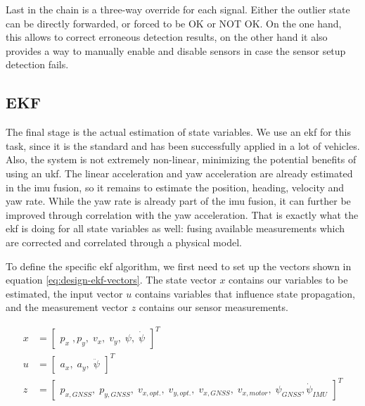 Last in the chain is a three-way override for each signal. Either the outlier state can be directly forwarded, or forced to be OK or NOT OK. On the one hand, this allows to correct erroneous detection results, on the other hand it also provides a way to manually enable and disable sensors in case the sensor setup detection fails.

\subsection{EKF}
The final stage is the actual estimation of state variables. We use an \gls{ekf} for this task, since it is the standard and has been successfully applied in a lot of vehicles. Also, the system is not extremely non-linear, minimizing the potential benefits of using an \gls{ukf}. The linear acceleration and yaw acceleration are already estimated in the \gls{imu} fusion, so it remains to estimate the position, heading, velocity and yaw rate. While the yaw rate is already part of the \gls{imu} fusion, it can further be improved through correlation with the yaw acceleration. That is exactly what the \gls{ekf} is doing for all state variables as well: fusing available measurements which are corrected and correlated through a physical model.

To define the specific \gls{ekf} algorithm, we first need to set up the vectors shown in equation \ref{eq:design-ekf-vectors}. The state vector $x$ contains our variables to be estimated, the input vector $u$ contains variables that influence state propagation, and the measurement vector $z$ contains our sensor measurements.

\begin{subequations}\label{eq:design-ekf-vectors}
\begin{alignat}{2}%
x &= \begin{bmatrix}p_x\;, p_y,\; v_x,\; v_y,\; \psi,\; \dot{\psi}\end{bmatrix}^T \\%
u &= \begin{bmatrix}a_x,\; a_y,\; \ddot{\psi}\end{bmatrix}^T \\%
z &= \begin{bmatrix}p_{x,\textit{GNSS}},\; p_{y,\textit{GNSS}},\; v_{x,opt.},\; v_{y,opt.},\; v_{x,\textit{GNSS}},\; v_{x,motor},\; \psi_{\textit{GNSS}}, \dot{\psi}_{\textit{IMU}}\end{bmatrix}^T
\end{alignat}
\end{subequations}

